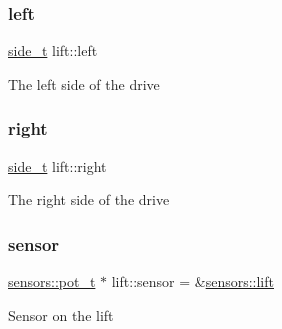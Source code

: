 \subsubsection{\texorpdfstring{left}{left}}
{\footnotesize\ttfamily \hyperlink{structlift_1_1side__t}{side\+\_\+t} lift\+::left}

The left side of the drive \mbox{\label{namespacelift_a62e75ece6036a2e9ef8c6edf92d668a1}} 
\subsubsection{\texorpdfstring{right}{right}}
{\footnotesize\ttfamily \hyperlink{structlift_1_1side__t}{side\+\_\+t} lift\+::right}

The right side of the drive \mbox{\label{namespacelift_af71770a66903080ec69dfc131240e214}} 
\subsubsection{\texorpdfstring{sensor}{sensor}}
{\footnotesize\ttfamily \hyperlink{structsensors_1_1pot__t}{sensors\+::pot\+\_\+t} $\ast$ lift\+::sensor = \&\hyperlink{namespacesensors_aadc3d3ede9ae5dc9a3c25bf89a113268}{sensors\+::lift}}

Sensor on the lift 
